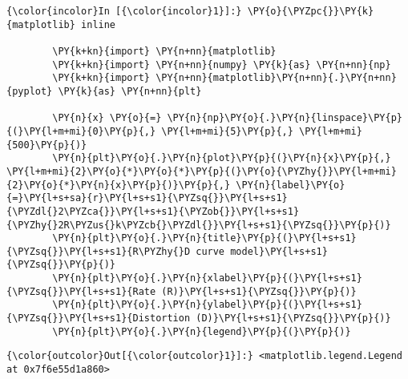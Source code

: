     \begin{Verbatim}[commandchars=\\\{\}]
{\color{incolor}In [{\color{incolor}1}]:} \PY{o}{\PYZpc{}}\PY{k}{matplotlib} inline
        
        \PY{k+kn}{import} \PY{n+nn}{matplotlib}
        \PY{k+kn}{import} \PY{n+nn}{numpy} \PY{k}{as} \PY{n+nn}{np}
        \PY{k+kn}{import} \PY{n+nn}{matplotlib}\PY{n+nn}{.}\PY{n+nn}{pyplot} \PY{k}{as} \PY{n+nn}{plt}
        
        \PY{n}{x} \PY{o}{=} \PY{n}{np}\PY{o}{.}\PY{n}{linspace}\PY{p}{(}\PY{l+m+mi}{0}\PY{p}{,} \PY{l+m+mi}{5}\PY{p}{,} \PY{l+m+mi}{500}\PY{p}{)}
        \PY{n}{plt}\PY{o}{.}\PY{n}{plot}\PY{p}{(}\PY{n}{x}\PY{p}{,} \PY{l+m+mi}{2}\PY{o}{*}\PY{o}{*}\PY{p}{(}\PY{o}{\PYZhy{}}\PY{l+m+mi}{2}\PY{o}{*}\PY{n}{x}\PY{p}{)}\PY{p}{,} \PY{n}{label}\PY{o}{=}\PY{l+s+sa}{r}\PY{l+s+s1}{\PYZsq{}}\PY{l+s+s1}{\PYZdl{}2\PYZca{}}\PY{l+s+s1}{\PYZob{}}\PY{l+s+s1}{\PYZhy{}2R\PYZus{}k\PYZcb{}\PYZdl{}}\PY{l+s+s1}{\PYZsq{}}\PY{p}{)}
        \PY{n}{plt}\PY{o}{.}\PY{n}{title}\PY{p}{(}\PY{l+s+s1}{\PYZsq{}}\PY{l+s+s1}{R\PYZhy{}D curve model}\PY{l+s+s1}{\PYZsq{}}\PY{p}{)}
        \PY{n}{plt}\PY{o}{.}\PY{n}{xlabel}\PY{p}{(}\PY{l+s+s1}{\PYZsq{}}\PY{l+s+s1}{Rate (R)}\PY{l+s+s1}{\PYZsq{}}\PY{p}{)}
        \PY{n}{plt}\PY{o}{.}\PY{n}{ylabel}\PY{p}{(}\PY{l+s+s1}{\PYZsq{}}\PY{l+s+s1}{Distortion (D)}\PY{l+s+s1}{\PYZsq{}}\PY{p}{)}
        \PY{n}{plt}\PY{o}{.}\PY{n}{legend}\PY{p}{(}\PY{p}{)}
\end{Verbatim}


\begin{Verbatim}[commandchars=\\\{\}]
{\color{outcolor}Out[{\color{outcolor}1}]:} <matplotlib.legend.Legend at 0x7f6e55d1a860>
\end{Verbatim}
            
    \begin{center}
    \end{center}
    { \hspace*{\fill} \\}
    
